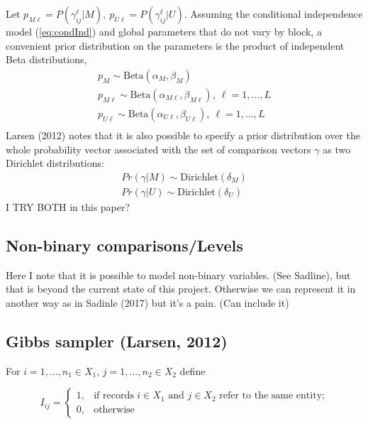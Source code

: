 \documentclass[11pt,reqno]{amsart}
\begin{document}
 Let $p_{M\ell} = P(\gamma_{ij}^{\ell} | M), \ p_{U\ell} = P(\gamma_{ij}^{\ell} | U)$.  Assuming the conditional independence model (\ref{eq:condInd}) and global parameters that do not vary by block, a convenient prior distribution on the parameters is the product of independent Beta distributions,
 \begin{gather*}
 p_M \sim \text{Beta}(\alpha_M, \beta_M) \\
 p_{M\ell} \sim \text{Beta}(\alpha_{M\ell}, \beta_{M\ell}), \ \ell = 1,\dots, L \\
  p_{U\ell} \sim \text{Beta}(\alpha_{U\ell}, \beta_{U\ell}), \ \ell = 1,\dots, L \\
 \end{gather*}
 Larsen (2012) notes that it is also possible to specify a prior distribution over the whole probability vector associated with the set of comparison vectors $\gamma$ as two Dirichlet distributions:
 \begin{gather*}
  Pr(\gamma | M) \sim \text{Dirichlet}(\delta_M) \\
 Pr(\gamma | U) \sim \text{Dirichlet}(\delta_U)
 \end{gather*}
 I TRY BOTH in this paper?  %
 
 \subsection{Non-binary comparisons/Levels} Here I note that it is possible to model non-binary variables. (See Sadline), but that is beyond the current state of this project. Otherwise we can represent it in another way as in Sadinle (2017) but it's a pain. (Can include it) %
 
 \subsection{Gibbs sampler (Larsen, 2012)}
 
For $i=1,\dots,n_1 \in X_1$, $j = 1, \dots, n_2 \in X_2$ define

$$I_{ij} = \begin{cases} 1, & \text{if records $i\in X_1$ and $j\in X_2$ refer to the same entity;} \\ 0, & \text{otherwise} \end{cases} $$ 
\end{document}
